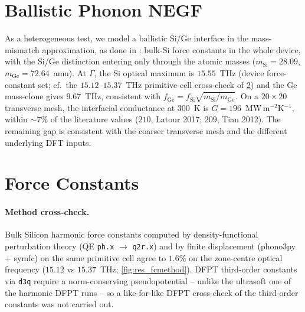 \section{Ballistic Phonon NEGF}
\label{sec:res_ballistic}

As a heterogeneous test, we model a ballistic Si/Ge interface in the
mass-mismatch approximation, as done in \cite{latour_ab_2017, tian_enhancing_2012, guo_quantum_2020}: bulk-Si force constants in the whole device, with
the Si/Ge distinction entering only through the atomic masses
($m_\mathrm{Si}=28.09$, $m_\mathrm{Ge}=72.64$~amu). At $\Gamma$, the Si
optical maximum is $15.55$~THz (device force-constant set; cf.\ the
$15.12$--$15.37$~THz primitive-cell cross-check of \cref{sec:res_fc}) and the Ge mass-clone gives $9.67$~THz,
consistent with $f_\mathrm{Ge}=f_\mathrm{Si}\sqrt{m_\mathrm{Si}/m_\mathrm{Ge}}$.
On a $20\times20$ transverse mesh, the interfacial conductance at
$300$~K is $G=196$~MW\,m$^{-2}$K$^{-1}$, within $\sim7\%$ of the
literature values ($210$, Latour 2017; $209$, Tian 2012). The
remaining gap is consistent with the coarser transverse mesh and the
different underlying DFT inputs.

\section{Force Constants}
\label{sec:res_fc}

\paragraph{Method cross-check.} Bulk Silicon harmonic force constants
computed by density-functional perturbation theory (QE \texttt{ph.x}
$\to$ \texttt{q2r.x}) and by finite displacement (phono3py + symfc) on
the same primitive cell agree to $1.6\%$ on the zone-centre optical
frequency ($15.12$ vs $15.37$~THz; \cref{fig:res_fcmethod}). DFPT third-order
constants via \texttt{d3q} require a norm-conserving pseudopotential -- unlike
the ultrasoft one of the harmonic DFPT runs -- so a like-for-like DFPT
cross-check of the third-order constants was not carried out.

